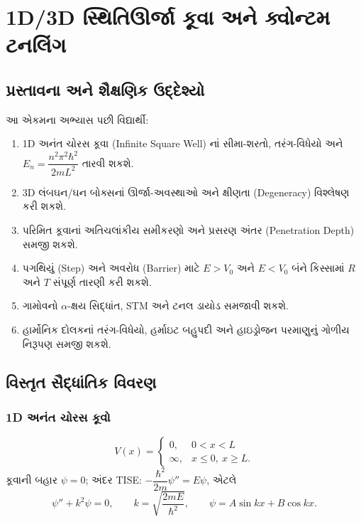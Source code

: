 \chapter[એકમ 4 : સ્થિતિઊર્જા કૂવા અને ટનલિંગ]{1D/3D સ્થિતિઊર્જા કૂવા અને ક્વોન્ટમ ટનલિંગ }

\section{પ્રસ્તાવના અને શૈક્ષણિક ઉદ્દેશ્યો}
\begin{uddeshyo}
આ એકમના અભ્યાસ પછી વિદ્યાર્થી:
\begin{enumerate}[label=\textbf{(\arabic*)}]
  \item 1D અનંત ચોરસ કૂવા (Infinite Square Well) નાં સીમા-શરતો, તરંગ-વિધેયો અને $E_n=\dfrac{n^2\pi^2\hbar^2}{2mL^2}$ તારવી શકશે.
  \item 3D લંબઘન/ઘન બોક્સનાં ઊર્જા-અવસ્થાઓ અને ક્ષીણતા (Degeneracy) વિશ્લેષણ કરી શકશે.
  \item પરિમિત કૂવાનાં અતિચલાંકીય સમીકરણો અને પ્રસરણ અંતર (Penetration Depth) સમજી શકશે.
  \item પગથિયું (Step) અને અવરોધ (Barrier) માટે $E>V_0$ અને $E<V_0$ બંને કિસ્સામાં $R$ અને $T$ સંપૂર્ણ તારણી કરી શકશે.
  \item ગામોવનો $\alpha$-ક્ષય સિદ્ધાંત, STM અને ટનલ ડાયોડ સમજાવી શકશે.
  \item હાર્મોનિક દોલકનાં તરંગ-વિધેયો, હર્માઇટ બહુપદી અને હાઇડ્રોજન પરમાણુનું ગોળીય નિરૂપણ સમજી શકશે.
\end{enumerate}
\end{uddeshyo}

\section{વિસ્તૃત સૈદ્ધાંતિક વિવરણ}

\subsection{1D અનંત ચોરસ કૂવો }
\[
V(x)=\begin{cases}0,&0<x<L\\ \infty,&x\le0,\ x\ge L.\end{cases}
\]
કૂવાની બહાર $\psi=0$; અંદર TISE: $-\dfrac{\hbar^{2}}{2m}\psi''=E\psi$, એટલે
\begin{equation}
\psi''+k^{2}\psi=0,\qquad k=\sqrt{\frac{2mE}{\hbar^{2}}},\qquad
\psi=A\sin kx+B\cos kx .
\label{eq:welleq}
\end{equation}


